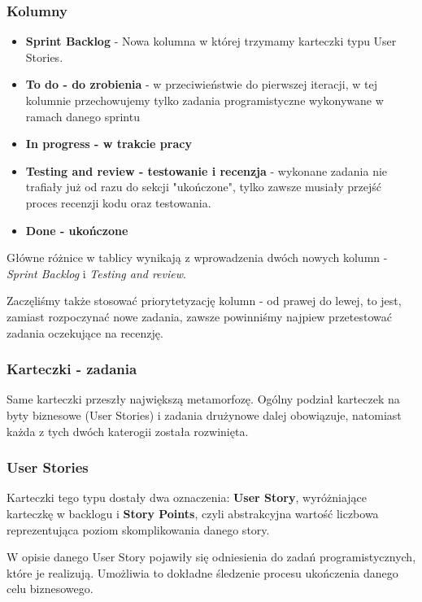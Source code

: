 \documentclass{article}
\begin{document}
\subsubsection*{Kolumny}
\begin{itemize}
    \item \textbf{Sprint Backlog} - Nowa kolumna w której trzymamy karteczki typu User Stories.
    \item \textbf{To do - do zrobienia} - w przeciwieństwie do pierwszej iteracji, w tej kolumnie przechowujemy tylko zadania programistyczne wykonywane w ramach danego sprintu
    \item \textbf{In progress - w trakcie pracy}
    \item \textbf{Testing and review - testowanie i recenzja} - wykonane zadania nie trafiały już od razu do sekcji "ukończone", tylko zawsze musiały przejść proces recenzji kodu oraz testowania.
    \item \textbf{Done - ukończone}
\end{itemize}
Główne różnice w tablicy wynikają z wprowadzenia dwóch nowych kolumn - \textit{Sprint Backlog} i \textit{Testing and review}.

Zaczęliśmy także stosować priorytetyzację kolumn - od prawej do lewej, to jest, zamiast rozpoczynać nowe zadania, zawsze powinniśmy najpiew przetestować zadania oczekujące na recenzję.

\subsubsection*{Karteczki - zadania}
Same karteczki przeszły największą metamorfozę. Ogólny podział karteczek na byty biznesowe (User Stories) i zadania drużynowe dalej obowiązuje, natomiast każda z tych dwóch katerogii została rozwinięta.

\subsubsection*{User Stories}
Karteczki tego typu dostały dwa oznaczenia: \textbf{User Story}, wyróżniające karteczkę w backlogu i \textbf{Story Points}, czyli abstrakcyjna wartość liczbowa reprezentująca poziom skomplikowania danego story.

W opisie danego User Story pojawiły się odniesienia do zadań programistycznych, które je realizują. Umożliwia to dokładne śledzenie procesu ukończenia danego celu biznesowego.
\end{document}

